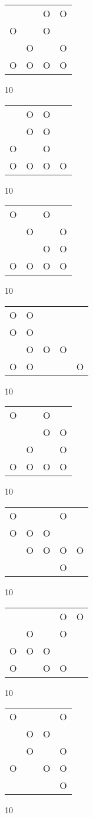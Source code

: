\begin{tabular}{|m{0.2cm}m{0.2cm}m{0.2cm}m{0.2cm}|}\hline
 & &O&O\\
O& &O& \\
 &O& &O\\
O&O&O&O\\
\hline\end{tabular}10
\begin{tabular}{|m{0.2cm}m{0.2cm}m{0.2cm}m{0.2cm}|}\hline
 &O&O& \\
 &O&O& \\
O& &O& \\
O&O&O&O\\
\hline\end{tabular}10
\begin{tabular}{|m{0.2cm}m{0.2cm}m{0.2cm}m{0.2cm}|}\hline
O& &O& \\
 &O& &O\\
 & &O&O\\
O&O&O&O\\
\hline\end{tabular}10
\begin{tabular}{|m{0.2cm}m{0.2cm}m{0.2cm}m{0.2cm}m{0.2cm}|}\hline
O&O& & & \\
O&O& & & \\
 &O&O&O& \\
O&O& & &O\\
\hline\end{tabular}10
\begin{tabular}{|m{0.2cm}m{0.2cm}m{0.2cm}m{0.2cm}|}\hline
O& &O& \\
 & &O&O\\
 &O& &O\\
O&O&O&O\\
\hline\end{tabular}10
\begin{tabular}{|m{0.2cm}m{0.2cm}m{0.2cm}m{0.2cm}m{0.2cm}|}\hline
O& & &O& \\
O&O&O& & \\
 &O&O&O&O\\
 & & &O& \\
\hline\end{tabular}10
\begin{tabular}{|m{0.2cm}m{0.2cm}m{0.2cm}m{0.2cm}m{0.2cm}|}\hline
 & & &O&O\\
 &O& &O& \\
O&O&O& & \\
O& &O&O& \\
\hline\end{tabular}10
\begin{tabular}{|m{0.2cm}m{0.2cm}m{0.2cm}m{0.2cm}|}\hline
O& & &O\\
 &O&O& \\
 &O& &O\\
O& &O&O\\
 & & &O\\
\hline\end{tabular}10
